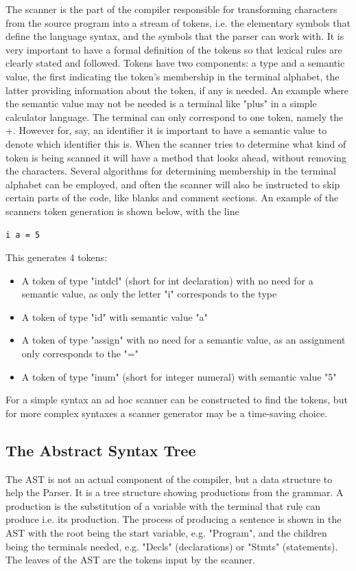 The scanner is the part of the compiler responsible for transforming characters from the source program into a stream of tokens, i.e. the elementary symbols that define the language syntax, and the symbols that the parser can work with.
It is very important to have a formal definition of the tokens so that lexical rules are clearly stated and followed.
Tokens have two components: a type and a semantic value, the first indicating the token's membership in the terminal alphabet, the latter providing information about the token, if any is needed.
An example where the semantic value may not be needed is a terminal like "plus" in a simple calculator language. The terminal can only correspond to one token, namely the +. However for, say, an identifier it is important to have a semantic value to denote which identifier this is.
When the scanner tries to determine what kind of token is being scanned it will have a method that looks ahead, without removing the characters. Several algorithms for determining membership in the terminal alphabet can be employed, and often the scanner will also be instructed to skip certain parts of the code, like blanks and comment sections.
An example of the scanners token generation is shown below, with the line
\begin{lstlisting}
i a = 5
\end{lstlisting}

This generates 4 tokens: 
\begin{itemize}
\item A token of type "intdcl" (short for int declaration) with no need for a semantic value, as only the letter "i" corresponds to the type 
\item A token of type "id" with semantic value "a" 
\item A token of type "assign" with no need for a semantic value, as an assignment only corresponds to the "="
\item A token of type "inum" (short for integer numeral) with semantic value "5"
\end{itemize}

For a simple syntax an ad hoc scanner can be constructed to find the tokens, but for more complex syntaxes a scanner generator may be a time-saving choice.

\subsection{The Abstract Syntax Tree}
The AST is not an actual component of the compiler, but a data structure to help the Parser. It is a tree structure showing productions from the grammar. A production is the substitution of a variable with the terminal that rule can produce i.e. its production. The process of producing a sentence is shown in the AST with the root being the start variable, e.g. "Program", and the children being the terminals needed, e.g. "Decls" (declarations) or "Stmts" (statements). The leaves of the AST are the tokens input by the scanner.

